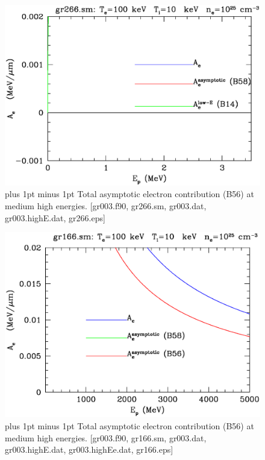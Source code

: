 \documentclass[preprint,12pt,eqsecnum,nofootinbib,amsmath,amssymb]{revtex4}
\newcommand{\footnoteskip}{\baselineskip 12pt plus 1pt minus 1pt}
\begin{document}
\pagebreak

\vskip-2cm 
\begin{figure}[h!]
\includegraphics[scale=0.45]{gr266.eps} 
\vskip-0.8cm 
\caption{\footnoteskip  
  Total asymptotic electron contribution (B56) at medium high
  energies.  [gr003.f90, gr266.sm, gr003.dat, 
  gr003.highE.dat, gr266.eps]
}
\label{fig:gr266}
\end{figure}

\vskip-2cm 
\begin{figure}[h!]
\includegraphics[scale=0.45]{gr166.eps} 
\vskip-0.8cm 
\caption{\footnoteskip  
  Total asymptotic electron contribution (B56) at medium high
  energies.  [gr003.f90, gr166.sm, gr003.dat, 
  gr003.highE.dat, gr003.highEe.dat, gr166.eps]
}
\label{fig:gr166}
\end{figure}
\end{document}
